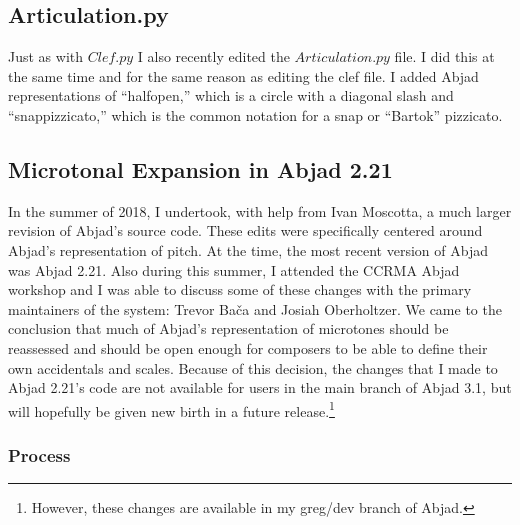 \subsection{Articulation.py}

Just as with $Clef.py$ I also recently edited the $Articulation.py$ file. I did this at the same time and for the same reason as editing the clef file. I added Abjad representations of ``halfopen,'' which is a circle with a diagonal slash and ``snappizzicato,'' which is the common notation for a snap or ``Bartok'' pizzicato.

\subsection{Microtonal Expansion in Abjad 2.21}

In the summer of 2018, I undertook, with help from Ivan Moscotta, a much larger revision of Abjad’s source code. These edits were specifically centered around Abjad’s representation of pitch. At the time, the most recent version of Abjad was Abjad 2.21. Also during this summer, I attended the CCRMA Abjad workshop and I was able to discuss some of these changes with the primary maintainers of the system: Trevor Ba\v{c}a and Josiah Oberholtzer. We came to the conclusion that much of Abjad’s representation of microtones should be reassessed and should be open enough for composers to be able to define their own accidentals and scales. Because of this decision, the changes that I made to Abjad 2.21’s code are not available for users in the main branch of Abjad 3.1, but will hopefully be given new birth in a future release.\footnote{However, these changes are available in my greg/dev branch of Abjad.}

\subsubsection{Process}

